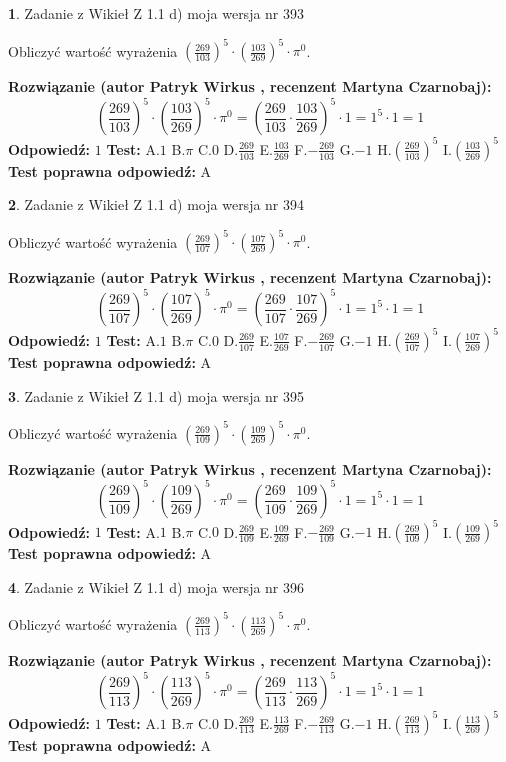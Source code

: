 \documentclass[12pt, a4paper]{article}
\theoremstyle{definition} %
\newtheorem{zad}{}
\newcommand{\zadStart}[1]{\begin{zad}#1\newline}
\newcommand{\zadStop}{\end{zad}}
\newcommand{\rozwStart}[2]{\noindent \textbf{Rozwiązanie (autor #1 , recenzent #2): }\newline}
\newcommand{\rozwStop}{\newline}
\newcommand{\odpStart}{\noindent \textbf{Odpowiedź:}\newline}
\newcommand{\odpStop}{\newline}
\newcommand{\testStart}{\noindent \textbf{Test:}\newline}
\newcommand{\testStop}{\newline}
\newcommand{\kluczStart}{\noindent \textbf{Test poprawna odpowiedź:}\newline}
\newcommand{\kluczStop}{\newline}
\begin{document}
\zadStart{Zadanie z Wikieł Z 1.1 d) moja wersja nr 393}

Obliczyć wartość wyrażenia $(\frac{269}{103})^{5} \cdot (\frac{103}{269})^{5} \cdot \pi^{0}$.
\zadStop
\rozwStart{Patryk Wirkus}{Martyna Czarnobaj}
$$(\frac{269}{103})^{5} \cdot (\frac{103}{269})^{5} \cdot \pi^{0} = (\frac{269}{103} \cdot \frac{103}{269})^{5} \cdot 1 = 1^{5} \cdot 1 = 1$$
\rozwStop
\odpStart
$1$
\odpStop
\testStart
A.$1$ B.$\pi$ C.$0$ D.$\frac{269}{103}$ E.$\frac{103}{269}$
F.$-\frac{269}{103}$ G.$-1$
H.$(\frac{269}{103})^{5}$
I.$(\frac{103}{269})^{5}$
\testStop
\kluczStart
A
\kluczStop



\zadStart{Zadanie z Wikieł Z 1.1 d) moja wersja nr 394}

Obliczyć wartość wyrażenia $(\frac{269}{107})^{5} \cdot (\frac{107}{269})^{5} \cdot \pi^{0}$.
\zadStop
\rozwStart{Patryk Wirkus}{Martyna Czarnobaj}
$$(\frac{269}{107})^{5} \cdot (\frac{107}{269})^{5} \cdot \pi^{0} = (\frac{269}{107} \cdot \frac{107}{269})^{5} \cdot 1 = 1^{5} \cdot 1 = 1$$
\rozwStop
\odpStart
$1$
\odpStop
\testStart
A.$1$ B.$\pi$ C.$0$ D.$\frac{269}{107}$ E.$\frac{107}{269}$
F.$-\frac{269}{107}$ G.$-1$
H.$(\frac{269}{107})^{5}$
I.$(\frac{107}{269})^{5}$
\testStop
\kluczStart
A
\kluczStop



\zadStart{Zadanie z Wikieł Z 1.1 d) moja wersja nr 395}

Obliczyć wartość wyrażenia $(\frac{269}{109})^{5} \cdot (\frac{109}{269})^{5} \cdot \pi^{0}$.
\zadStop
\rozwStart{Patryk Wirkus}{Martyna Czarnobaj}
$$(\frac{269}{109})^{5} \cdot (\frac{109}{269})^{5} \cdot \pi^{0} = (\frac{269}{109} \cdot \frac{109}{269})^{5} \cdot 1 = 1^{5} \cdot 1 = 1$$
\rozwStop
\odpStart
$1$
\odpStop
\testStart
A.$1$ B.$\pi$ C.$0$ D.$\frac{269}{109}$ E.$\frac{109}{269}$
F.$-\frac{269}{109}$ G.$-1$
H.$(\frac{269}{109})^{5}$
I.$(\frac{109}{269})^{5}$
\testStop
\kluczStart
A
\kluczStop



\zadStart{Zadanie z Wikieł Z 1.1 d) moja wersja nr 396}

Obliczyć wartość wyrażenia $(\frac{269}{113})^{5} \cdot (\frac{113}{269})^{5} \cdot \pi^{0}$.
\zadStop
\rozwStart{Patryk Wirkus}{Martyna Czarnobaj}
$$(\frac{269}{113})^{5} \cdot (\frac{113}{269})^{5} \cdot \pi^{0} = (\frac{269}{113} \cdot \frac{113}{269})^{5} \cdot 1 = 1^{5} \cdot 1 = 1$$
\rozwStop
\odpStart
$1$
\odpStop
\testStart
A.$1$ B.$\pi$ C.$0$ D.$\frac{269}{113}$ E.$\frac{113}{269}$
F.$-\frac{269}{113}$ G.$-1$
H.$(\frac{269}{113})^{5}$
I.$(\frac{113}{269})^{5}$
\testStop
\kluczStart
A
\kluczStop
\end{document}
